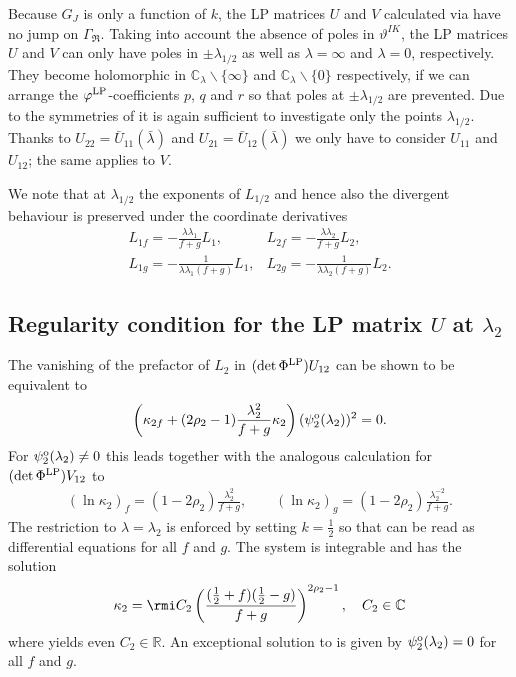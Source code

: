 \documentclass[12pt]{iopart}
\begin{document}
Because $G_J$ is only a function of $k$, the LP matrices $U$ and $V$ calculated via  have no jump on $\Gamma_\Re$. Taking into account the absence of poles in $\vartheta^{IK}$, the LP matrices $U$ and $V$ can only have poles in $\pm\lambda_{1/2}$ as well as $\lambda=\infty$ and $\lambda=0$, respectively. They become holomorphic in $\mathbb{C}_{\lambda}\backslash\{\infty\}$ and $\mathbb{C}_{\lambda}\backslash\{0\}$ respectively, if we can arrange the $\varphi^{\rm LP}$-coefficients $p$, $q$ and $r$ so that poles at $\pm\lambda_{1/2}$ are prevented. Due to the symmetries of  it is again sufficient to investigate only the points $\lambda_{1/2}$. Thanks to $U_{22}=\bar{U}_{11}(\bar{\lambda})$ and $U_{21}=\bar{U}_{12}(\bar{\lambda})$ we only have to consider $U_{11}$ and $U_{12}$; the same applies to $V$.

We note that at $\lambda_{1/2}$ the exponents of $L_{1/2}$ and hence also the divergent behaviour  is preserved under the coordinate derivatives
\begin{equation}\begin{array}{ll}
L_{1f}=-\frac{\lambda\lambda_1}{f+g}L_1, &
  L_{2f}=-\frac{\lambda\lambda_2}{f+g}L_2,  \\
L_{1g}=-\frac{1}{\lambda\lambda_1(f+g)}L_1, &
  L_{2g}=-\frac{1}{\lambda\lambda_2(f+g)}L_2.
\end{array}\end{equation}



\subsection{Regularity condition for the LP matrix $U$ at $\lambda_2$}

The vanishing of the prefactor of $L_2$ in $(\det \Phi^{\rm LP}) U_{12}$ can be shown to be equivalent to
\begin{eqnarray}
\left(\kappa_{2f}+(2\rho_2-1)\frac{\lambda_2^2}{f+g}\kappa_2\right)(\psi_2^{\rm o}(\lambda_2))^2=0. \label{kappa2DGL}
\end{eqnarray}
For $\psi_2^{\rm o}(\lambda_2)\neq 0$ this leads together with the analogous calculation for $(\det \Phi^{\rm LP}) V_{12}$ to
\begin{eqnarray}
(\ln\kappa_2)_f=(1-2\rho_2)\frac{\lambda_2^2}{f+g}, \quad\quad
(\ln\kappa_2)_g=(1-2\rho_2)\frac{\lambda_2^{-2}}{f+g}. \label{kappa2DGL2}
\end{eqnarray}
The restriction to $\lambda=\lambda_2$ is enforced by setting $k=\frac12$ so that  can be read as differential equations for all $f$ and $g$. The system is integrable and has the solution
\begin{eqnarray}
\kappa_2=\rmi C_2\left(\frac{(\frac12+f)(\frac12-g)}{f+g}\right)^{2\rho_2-1},\quad C_2\in\mathbb{C}
\end{eqnarray}
where  yields even $C_2\in\mathbb{R}$. An exceptional solution to  is given by $\psi_2^{\rm o}(\lambda_2)=0$ for all $f$ and $g$.
\end{document}
